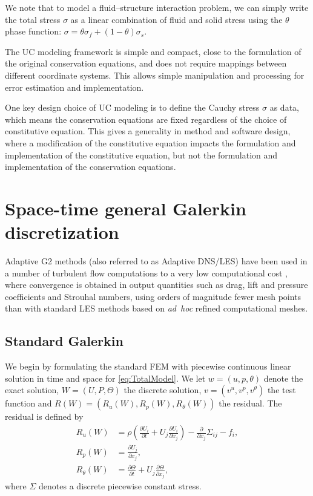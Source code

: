 We note that to model a fluid--structure interaction problem, we can
simply write the total stress $\sigma$ as a linear combination of
fluid and solid stress using the $\theta$ phase function: $\sigma = \theta \sigma_f + (1 - \theta) \sigma_s$.

The UC modeling framework is simple and compact, close to the
formulation of the original conservation equations, and does not
require mappings between different coordinate systems. This allows
simple manipulation and processing for error estimation and
implementation.

One key design choice of UC modeling is to define the Cauchy stress
$\sigma$ as data, which means the conservation equations are fixed
regardless of the choice of constitutive equation. This gives a
generality in method and software design, where a modification of the
constitutive equation impacts the formulation and implementation of
the constitutive equation, but not the formulation and implementation
of the conservation equations.

\section{Space-time general Galerkin discretization}

Adaptive G2 methods (also referred to as Adaptive DNS/LES) have been
used in a number of turbulent flow computations to a very low
computational cost
\citep{Hoffman2005,HoffmanJohnson2006b,Hoffman2006,Hoffman2009,HoffmanJansson2009,VilelaJanssonEtAl2010},
where convergence is obtained in output quantities such as drag, lift
and pressure coefficients and Strouhal numbers, using orders of
magnitude fewer mesh points than with standard LES methods based on
\emph{ad~hoc} refined computational meshes.

\subsection{Standard Galerkin}

We begin by formulating the standard \cgone{}\cgone{} FEM
\citep{ErikssonEstepHansboEtAl1996} with piecewise continuous linear
solution in time and space for \eqref{eq:TotalModel}. We let $w = (u,
  p, \theta)$ denote the exact solution, $W = (U, P, \Theta)$ the
discrete solution, $v = (v^u, v^p, v^\theta)$ the test function and
$R(W) = (R_u(W), R_p(W), R_\theta(W))$ the residual. The residual is defined by
\begin{equation} \label{eq:TotalModel}
  \begin{split}
    R_u(W) &= \rho\left(\frac{\partial U_i}{\partial t} + U_j \frac{\partial U_i}{\partial x_j} \right) - \frac{\partial}{\partial x_j} \Sigma_{ij} - f_i,\\
    R_p(W) &= \frac{\partial U_j}{\partial x_j},\\
    R_\theta(W) &= \frac{\partial\Theta}{\partial t} + U_j \frac{\partial \Theta}{\partial x_j},
  \end{split}
\end{equation}
where $\Sigma$ denotes a discrete piecewise constant stress.

